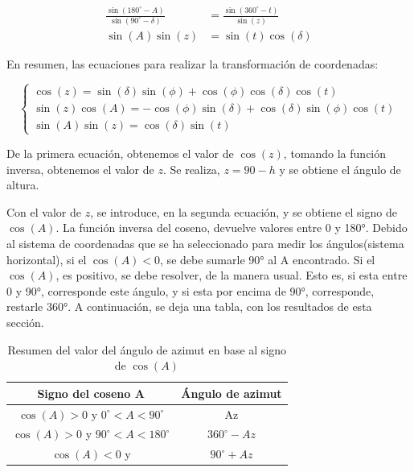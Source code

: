 \begin{equation}
	\begin{split}
		\frac{\sin(180^\circ-A)}{\sin(90^\circ-\delta)} &= \frac{\sin(360^\circ-t)}{\sin(z)} \\ 
		\sin(A)\sin(z) &= \sin(t)\cos(\delta) 
	\end{split}
\end{equation}

En resumen, las ecuaciones para realizar la transformación de coordenadas: 

\begin{equation} \label{eq:law_transform_coordinates}
	\begin{cases} 
		\cos(z) = \sin(\delta)\sin(\phi) + \cos(\phi)\cos(\delta)\cos(t) \\ 
		\sin(z)\cos(A) = -\cos(\phi)\sin(\delta) + \cos(\delta)\sin(\phi)\cos(t) \\	
		\sin(A)\sin(z) = \cos(\delta) \sin(t) 
	\end{cases}  
\end{equation}

De la primera ecuación, obtenemos el valor de $\cos(z)$, tomando la función inversa, obtenemos el valor de $z$. Se realiza, $z = 90 -h$ y se obtiene el ángulo de altura. 

Con el valor de $z$, se introduce, en la segunda ecuación, y se obtiene el signo de $\cos(A)$. La función inversa del coseno, devuelve valores entre 0 y 180°. Debido al sistema de coordenadas que se ha seleccionado para medir los ángulos(sistema horizontal), si el $\cos(A)<0$, se debe sumarle 90° al A encontrado. Si el $\cos(A)$, es positivo, se debe resolver, de la manera usual. Esto es, si esta entre 0 y 90°, corresponde este ángulo, y si esta por encima de 90°, corresponde, restarle 360°. A continuación, se deja una tabla, con los resultados de esta sección. 

\begin{table}[ht!]
	\centering
	\begin{tabular}{|c|c|}
		\hline
		Signo del coseno A & Ángulo de azimut  \\
		\hline 
		$\cos(A)>0$ y  $0^\circ<A<90^\circ$ & Az \\
		\hline
		$\cos(A)>0$ y  $90^\circ<A<180^\circ$ & $360^\circ - Az$ \\
		\hline
		$\cos(A)<0$ y  &  $90^\circ + Az$ \\
        \hline
	\end{tabular}
	\caption{Resumen del valor del ángulo de azimut en base al signo de $\cos(A)$}
\end{table}

